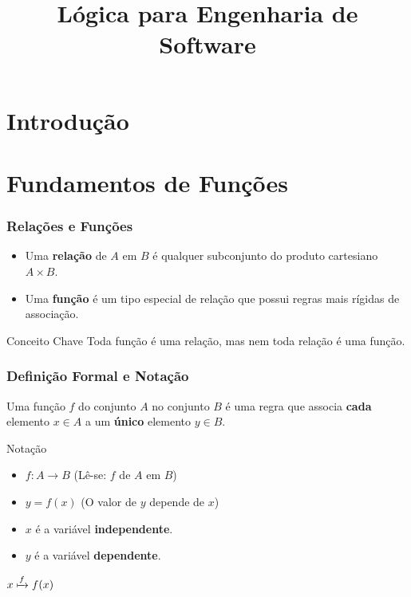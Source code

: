 \documentclass[9pt]{beamer}
\title[Presentation]{Lógica para Engenharia de Software} %
\institute[UniRV]{\textbf{\large  \textcolor{structure}{\textbf{\large
Funções, Definição, domínio, imagem e composição de funções.
}}} %
\\ \qquad
\\Professor: Me. Sergio Souza Novak 
\\Faculdade de Engenharia de Software}
\date{}
\begin{document}
\begin{frame}
\titlepage
\end{frame}

\section{Introdução}

\section{Fundamentos de Funções}

\begin{frame}
\frametitle{Relações e Funções}
\begin{itemize}
    \item Uma \textbf{relação} de $A$ em $B$ é qualquer subconjunto do produto cartesiano $A \times B$.
    \item Uma \textbf{função} é um tipo especial de relação que possui regras mais rígidas de associação.
\end{itemize}

\begin{block}{Conceito Chave}
Toda função é uma relação, mas nem toda relação é uma função.
\end{block}

\centering
{}
\end{frame}

\begin{frame}
\frametitle{Definição Formal e Notação}
Uma função $f$ do conjunto $A$ no conjunto $B$ é uma regra que associa \textbf{cada} elemento $x \in A$ a um \textbf{único} elemento $y \in B$.

\begin{block}{Notação}
\begin{itemize}
    \item $f: A \to B$ (Lê-se: $f$ de $A$ em $B$)
    \item $y = f(x)$ (O valor de $y$ depende de $x$)
    \item $x$ é a variável \textbf{independente}.
    \item $y$ é a variável \textbf{dependente}.
\end{itemize}
\end{block}

\centering
\Large $x \xmapsto{f} f(x)$
\end{frame}
\end{document}
